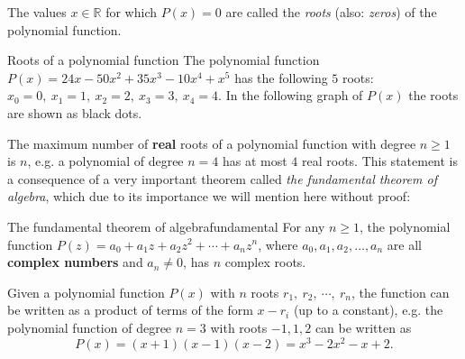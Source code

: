 The values $x\in\mathbb{R}$ for which $P(x)=0$ are called the \emph{roots} (also: \emph{zeros}) of the polynomial function.

\begin{example}{Roots of a polynomial function}{}
	The polynomial function $P(x) = 24x - 50x^{2} + 35x^{3} - 10x^{4} + x^{5}$ has the following $5$ roots: $x_{0}=0,\ x_{1}=1,\ x_{2}=2,\ x_{3}=3,\ x_{4}=4$. In the following graph of $P(x)$ the roots are shown as black dots.
	\begin{figure}[H]
		\centering
	\end{figure}
\end{example}

The maximum number of \textbf{real} roots of a polynomial function with degree $n\geq1$ is $n$, e.g. a polynomial of degree $n=4$ has at most $4$ real roots. This statement is a consequence of a very important theorem called \emph{the fundamental theorem of algebra}, which due to its importance we will mention here without proof:

\begin{theorem}{The fundamental theorem of algebra}{fundamental}
	For any $n\geq1$, the polynomial function $P(z)=a_{0}+a_{1}z+a_{2}z^{2}+\cdots+a_{n}z^{n}$, where $a_{0},a_{1},a_{2},\dots,a_{n}$ are all \textbf{complex numbers} and $a_{n}\neq0$, has $n$ complex roots.
\end{theorem}

Given a polynomial function $P(x)$ with $n$ roots $r_{1},\ r_{2},\ \cdots,\ r_{n}$, the function can be written as a product of terms of the form $x-r_{i}$ (up to a constant), e.g. the polynomial function of degree $n=3$ with roots $-1,1,2$ can be written as
\begin{equation}
	P(x) = (x+1)(x-1)(x-2) = x^{3}-2x^{2}-x+2.
	\label{eq:roots_form}
\end{equation}

